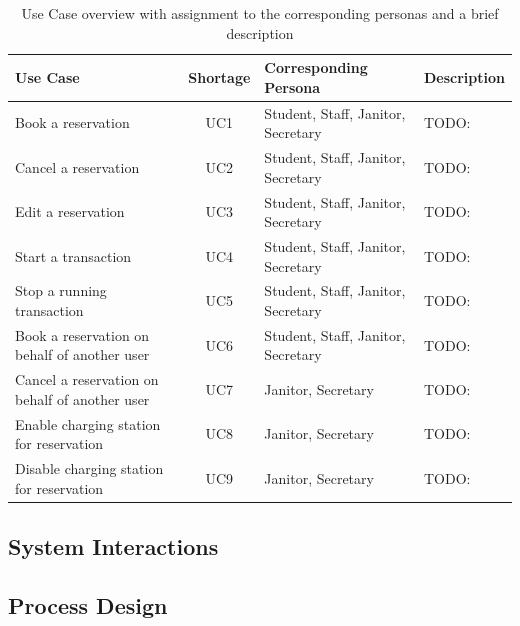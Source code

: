 \begingroup
\setlength{\tabcolsep}{10pt} %
\renewcommand{\arraystretch}{1.5} %
\begin{table}[h!]
    \centering
    \begin{tabular}{m{3.5cm}|c|m{3cm}|m{4cm}}
        Use Case & Shortage & Corresponding Persona & Description \\
        \hline
        Book a reservation & UC1 & Student, Staff, Janitor, Secretary & TODO: \\
        Cancel a reservation & UC2 & Student, Staff, Janitor, Secretary & TODO: \\
        Edit a reservation & UC3 & Student, Staff, Janitor, Secretary & TODO: \\
        Start a transaction & UC4 & Student, Staff, Janitor, Secretary & TODO: \\
        Stop a running transaction & UC5 & Student, Staff, Janitor, Secretary & TODO: \\
        Book a reservation on behalf of another user  & UC6 & Student, Staff, Janitor, Secretary & TODO: \\ 
        Cancel a reservation on behalf of another user & UC7 & Janitor, Secretary & TODO: \\
        Enable charging station for reservation & UC8 & Janitor, Secretary & TODO: \\
        Disable charging station for reservation & UC9 & Janitor, Secretary & TODO: \\
    \end{tabular}
    \caption{Use Case overview with assignment to the corresponding personas and a brief description}
    \label{tab:use_case_overview}
\end{table}
\endgroup

\subsection{System Interactions}
\label{ch:Requirements Engineering and Process Design:sec:Scenario:ssec:System Interactions}

\subsection{Process Design}
\label{ch:Requirements Engineering and Process Design:sec:Scenario:ssec:Process Design}

